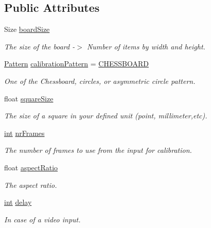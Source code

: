\subsection*{Public Attributes}
\begin{DoxyCompactItemize}
\item 
Size \mbox{\hyperlink{class_cal_settings_a873bc1dc2387dbb8a73c8e47f53e1df8}{board\+Size}}
\begin{DoxyCompactList}\small\item\em The size of the board -\/$>$ Number of items by width and height. \end{DoxyCompactList}\item 
\mbox{\hyperlink{class_cal_settings_a0a24f2a2a233efe9213f28e527314500}{Pattern}} \mbox{\hyperlink{class_cal_settings_a500d222eca5419dcf8d3923b8f9d45a1}{calibration\+Pattern}} = \mbox{\hyperlink{class_cal_settings_a0a24f2a2a233efe9213f28e527314500abbce277bb8f1f2450efbf10d14258264}{C\+H\+E\+S\+S\+B\+O\+A\+RD}}
\begin{DoxyCompactList}\small\item\em One of the Chessboard, circles, or asymmetric circle pattern. \end{DoxyCompactList}\item 
float \mbox{\hyperlink{class_cal_settings_a14597574ec3d7c1a4d5f3cb9e555b887}{square\+Size}}
\begin{DoxyCompactList}\small\item\em The size of a square in your defined unit (point, millimeter,etc). \end{DoxyCompactList}\item 
\mbox{\hyperlink{draw_8hh_aa620a13339ac3a1177c86edc549fda9b}{int}} \mbox{\hyperlink{class_cal_settings_a952a1f99909768b2af2580b9be94ce9d}{nr\+Frames}}
\begin{DoxyCompactList}\small\item\em The number of frames to use from the input for calibration. \end{DoxyCompactList}\item 
float \mbox{\hyperlink{class_cal_settings_a25bbf73423679421ceff2f9f8cf485cd}{aspect\+Ratio}}
\begin{DoxyCompactList}\small\item\em The aspect ratio. \end{DoxyCompactList}\item 
\mbox{\hyperlink{draw_8hh_aa620a13339ac3a1177c86edc549fda9b}{int}} \mbox{\hyperlink{class_cal_settings_abefb1d66ea3a38cdc937ab0647643479}{delay}}
\begin{DoxyCompactList}\small\item\em In case of a video input. \end{DoxyCompactList}\item 

\end{DoxyCompactItemize}
